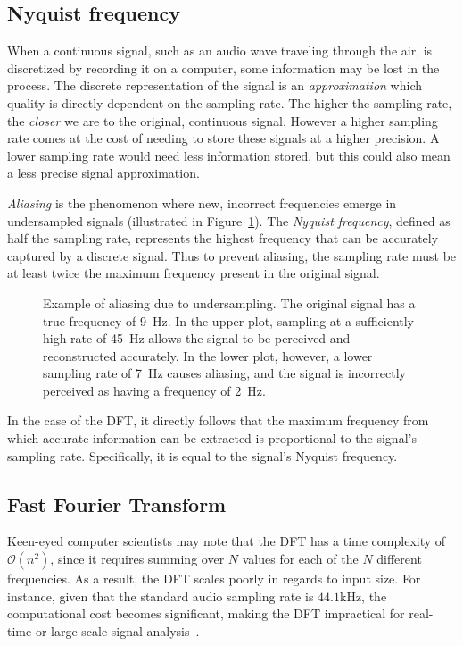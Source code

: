 \subsection{Nyquist frequency}

When a continuous signal, such as an audio wave traveling through the air, is discretized by recording it on a computer, some information may be lost in the process. The discrete representation of the signal is an \textit{approximation} which quality is directly dependent on the sampling rate. The higher the sampling rate, the \textit{closer} we are to the original, continuous signal. However a higher sampling rate comes at the cost of needing to store these signals at a higher precision. A lower sampling rate would need less information stored, but this could also mean a less precise signal approximation.

\textit{Aliasing} is the phenomenon where new, incorrect frequencies emerge in undersampled signals (illustrated in Figure~\ref{AliasingFigure}). The \textit{Nyquist frequency}, defined as half the sampling rate, represents the highest frequency that can be accurately captured by a discrete signal. Thus to prevent aliasing, the sampling rate must be at least twice the maximum frequency present in the original signal.

\begin{figure}[H]
    \centering
    
    \caption{Example of aliasing due to undersampling. The original signal has a true frequency of 9~Hz. In the upper plot, sampling at a sufficiently high rate of 45~Hz allows the signal to be perceived and reconstructed accurately. In the lower plot, however, a lower sampling rate of 7~Hz causes aliasing, and the signal is incorrectly perceived as having a frequency of 2~Hz.}
    \label{AliasingFigure}
\end{figure}

In the case of the \gls{DFT}, it directly follows that the maximum frequency from which accurate information can be extracted is proportional to the signal's sampling rate. Specifically, it is equal to the signal's Nyquist frequency.

\subsection{Fast Fourier Transform}

Keen-eyed computer scientists may note that the \gls{DFT} has a time complexity of $\mathcal{O}(n^2)$, since it requires summing over $N$ values for each of the $N$ different frequencies. As a result, the \gls{DFT} scales poorly in regards to input size. For instance, given that the standard audio sampling rate is $44.1 \text{kHz}$, the computational cost becomes significant, making the \gls{DFT} impractical for real-time or large-scale signal analysis~\cite{pras2010sampling}.

